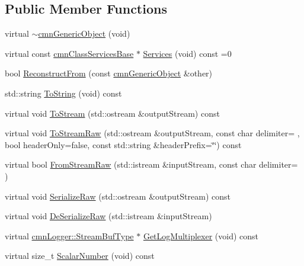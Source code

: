 \subsection*{Public Member Functions}
\begin{DoxyCompactItemize}
\item 
virtual \hyperlink{classcmn_generic_object_ac46f55295b1cef7277f6083a546329af}{$\sim$cmn\+Generic\+Object} (void)
\item 
virtual const \hyperlink{classcmn_class_services_base}{cmn\+Class\+Services\+Base} $\ast$ \hyperlink{classcmn_generic_object_ac1e9145a0ed0711ac0c0c3edd37b673a}{Services} (void) const =0
\item 
bool \hyperlink{classcmn_generic_object_a7507c3e8f396099599595a0e7f37a89e}{Reconstruct\+From} (const \hyperlink{classcmn_generic_object}{cmn\+Generic\+Object} \&other)
\item 
std\+::string \hyperlink{classcmn_generic_object_a204a55fc8b83c33d241854a77fb5fe0c}{To\+String} (void) const 
\item 
virtual void \hyperlink{classcmn_generic_object_ac2b71ce10573cceff0446748432f45df}{To\+Stream} (std\+::ostream \&output\+Stream) const 
\item 
virtual void \hyperlink{classcmn_generic_object_a8810f78cd3621f37c5e9bbc4679795ce}{To\+Stream\+Raw} (std\+::ostream \&output\+Stream, const char delimiter= \textquotesingle{} \textquotesingle{}, bool header\+Only=false, const std\+::string \&header\+Prefix=\char`\"{}\char`\"{}) const 
\item 
virtual bool \hyperlink{classcmn_generic_object_a41a64299c2410e2bb8e9ff274daad3ed}{From\+Stream\+Raw} (std\+::istream \&input\+Stream, const char delimiter= \textquotesingle{} \textquotesingle{})
\item 
virtual void \hyperlink{classcmn_generic_object_a8ded5b1c123d923040cd17071f95d8ca}{Serialize\+Raw} (std\+::ostream \&output\+Stream) const 
\item 
virtual void \hyperlink{classcmn_generic_object_a19babea5bb663491b7ff98ef6fce972f}{De\+Serialize\+Raw} (std\+::istream \&input\+Stream)
\item 
virtual \hyperlink{classcmn_logger_a7d192777882d1dc6bb48ceac0b4e65bb}{cmn\+Logger\+::\+Stream\+Buf\+Type} $\ast$ \hyperlink{classcmn_generic_object_a93b122c39a158861bcda067fd5899dcb}{Get\+Log\+Multiplexer} (void) const 
\item 
virtual size\+\_\+t \hyperlink{classcmn_generic_object_ae4e43bf8fd4a1eb17e210b838d8f553c}{Scalar\+Number} (void) const 
\item 

\end{DoxyCompactItemize}
